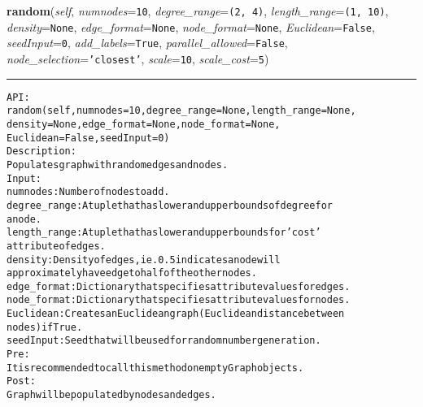 \begin{boxedminipage}{\funcwidth}
\setlength{\parskip}{1ex}
    \end{boxedminipage}

    \label{coinor:gimpy:graph:Graph:random}

    \vspace{0.5ex}

\hspace{.8\funcindent}\begin{boxedminipage}{\funcwidth}

    \raggedright \textbf{random}(\textit{self}, \textit{numnodes}={\tt 10}, \textit{degree\_range}={\tt \texttt{(}2\texttt{, }4\texttt{)}}, \textit{length\_range}={\tt \texttt{(}1\texttt{, }10\texttt{)}}, \textit{density}={\tt None}, \textit{edge\_format}={\tt None}, \textit{node\_format}={\tt None}, \textit{Euclidean}={\tt False}, \textit{seedInput}={\tt 0}, \textit{add\_labels}={\tt True}, \textit{parallel\_allowed}={\tt False}, \textit{node\_selection}={\tt \texttt{'}\texttt{closest}\texttt{'}}, \textit{scale}={\tt 10}, \textit{scale\_cost}={\tt 5})

    \vspace{-1.5ex}

    \rule{\textwidth}{0.5\fboxrule}
\setlength{\parskip}{2ex}
\begin{alltt}

API:
    random(self, numnodes = 10, degree\_range = None, length\_range = None,
       density = None, edge\_format = None, node\_format = None,
       Euclidean = False, seedInput = 0)
Description:
    Populates graph with random edges and nodes.
Input:
    numnodes: Number of nodes to add.
    degree\_range: A tuple that has lower and upper bounds of degree for
    a node.
    length\_range: A tuple that has lower and upper bounds for 'cost'
    attribute of edges.
    density: Density of edges, ie. 0.5 indicates a node will
    approximately have edge to half of the other nodes.
    edge\_format: Dictionary that specifies attribute values for edges.
    node\_format: Dictionary that specifies attribute values for nodes.
    Euclidean: Creates an Euclidean graph (Euclidean distance between
    nodes) if True.
    seedInput: Seed that will be used for random number generation.
Pre:
    It is recommended to call this method on empty Graph objects.
Post:
    Graph will be populated by nodes and edges.
\end{alltt}

\setlength{\parskip}{1ex}
    \end{boxedminipage}

